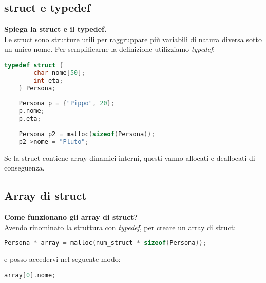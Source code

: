 \subsection{struct e typedef}
\textbf{Spiega la struct e il typedef.}\\
Le struct sono strutture utili per raggruppare più variabili di natura diversa sotto un unico nome. Per semplificarne la definizione utilizziamo \textit{typedef}:
\begin{lstlisting}[language=C]
	typedef struct {
		char nome[50];
		int eta;
	} Persona;
	
	Persona p = {"Pippo", 20};
	p.nome;
	p.eta;
	
	Persona p2 = malloc(sizeof(Persona));
	p2->nome = "Pluto";
\end{lstlisting}
\begin{note}
	Se la struct contiene array dinamici interni, questi vanno allocati e deallocati di conseguenza.
\end{note}

\subsection{Array di struct}
\textbf{Come funzionano gli array di struct?}\\
Avendo rinominato la struttura con \textit{typedef}, per creare un array di struct:
\begin{lstlisting}[language=C]
	Persona * array = malloc(num_struct * sizeof(Persona));
\end{lstlisting}
e posso accedervi nel seguente modo:
\begin{lstlisting}[language=C]
	array[0].nome;
\end{lstlisting}
